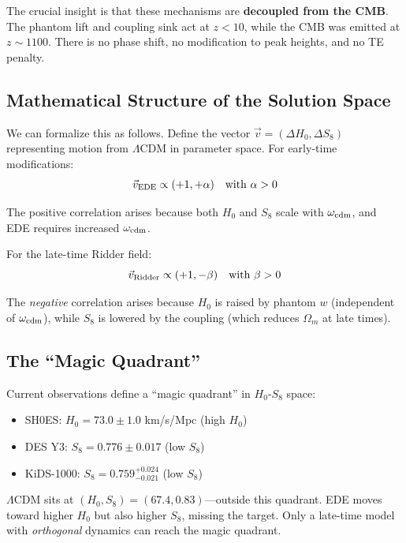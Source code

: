 \documentclass[twocolumn,showpacs,preprintnumbers,amsmath,amssymb,prd]{revtex4-2}
\begin{document}
The crucial insight is that these mechanisms are \textbf{decoupled from the CMB}. The phantom lift and coupling sink act at $z < 10$, while the CMB was emitted at $z \sim 1100$. There is no phase shift, no modification to peak heights, and no TE penalty.

\subsection{Mathematical Structure of the Solution Space}

We can formalize this as follows. Define the vector $\vec{v} = (\Delta H_0, \Delta S_8)$ representing motion from $\Lambda$CDM in parameter space. For early-time modifications:
\begin{equation}
\vec{v}_{\rm EDE} \propto (+1, +\alpha) \quad \text{with } \alpha > 0
\end{equation}

The positive correlation arises because both $H_0$ and $S_8$ scale with $\omega_{\rm cdm}$, and EDE requires increased $\omega_{\rm cdm}$.

For the late-time Ridder field:
\begin{equation}
\vec{v}_{\rm Ridder} \propto (+1, -\beta) \quad \text{with } \beta > 0
\end{equation}

The \textit{negative} correlation arises because $H_0$ is raised by phantom $w$ (independent of $\omega_{\rm cdm}$), while $S_8$ is lowered by the coupling (which reduces $\Omega_m$ at late times).

\subsection{The ``Magic Quadrant''}

Current observations define a ``magic quadrant'' in $H_0$-$S_8$ space:
\begin{itemize}
    \item SH0ES: $H_0 = 73.0 \pm 1.0$ km/s/Mpc (high $H_0$)
    \item DES Y3: $S_8 = 0.776 \pm 0.017$ (low $S_8$)
    \item KiDS-1000: $S_8 = 0.759^{+0.024}_{-0.021}$ (low $S_8$)
\end{itemize}

$\Lambda$CDM sits at $(H_0, S_8) = (67.4, 0.83)$---outside this quadrant. EDE moves toward higher $H_0$ but also higher $S_8$, missing the target. Only a late-time model with \textit{orthogonal} dynamics can reach the magic quadrant.
\end{document}
